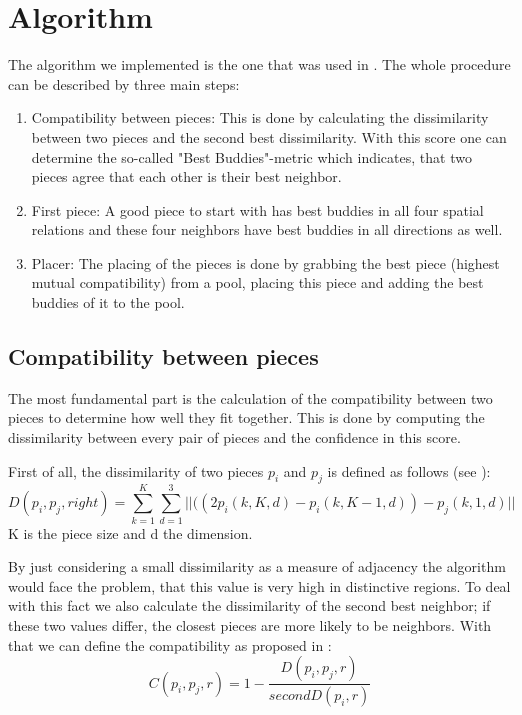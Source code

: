 \documentclass[11pt]{report}
\begin{document}
\section{Algorithm}
\label{sec:algo}
The algorithm we implemented is the one that was used in \cite{Paikin2015}. The whole procedure can be described by three main steps:
\begin{enumerate}
	\item Compatibility between pieces: This is done by calculating the dissimilarity between two pieces and the second best dissimilarity. With this score one can determine the so-called "Best Buddies"-metric which indicates, that two pieces agree that each other is their best neighbor.
	\item First piece: A good piece to start with has best buddies in all four spatial relations and these four neighbors have best buddies in all directions as well.
	\item Placer: The placing of the pieces is done by grabbing the best piece (highest mutual compatibility) from a pool, placing this piece and adding the best buddies of it to the pool.
\end{enumerate}

\subsection{Compatibility between pieces}
The most fundamental part is the calculation of the compatibility between two pieces to determine how well they fit together. This is done by computing the dissimilarity between every pair of pieces and the confidence in this score.

First of all, the dissimilarity of two pieces $p_i$ and $p_j$ is defined as follows (see \cite{Paikin2015}): 
\begin{equation}\label{eq:dissimilarity}
D(p_i,p_j,right) = \sum_{k=1}^K \sum_{d=1}^3 ||((2p_i(k,K,d) - p_i(k,K-1,d)) - p_j(k,1,d) ||
\end{equation}
K is the piece size and d the dimension.

By just considering a small dissimilarity as a measure of adjacency the algorithm would face the problem, that this value is very high in distinctive regions. To deal with this fact we also calculate the dissimilarity of the second best neighbor; if these two values differ, the closest pieces are more likely to be neighbors. With that we can define the compatibility as proposed in \cite{Paikin2015}:
\begin{equation}\label{eq:compatibility}
C(p_i,p_j,r) = 1 - \frac{D(p_i,p_j,r)}{secondD(p_i,r)}
\end{equation}
\end{document}
